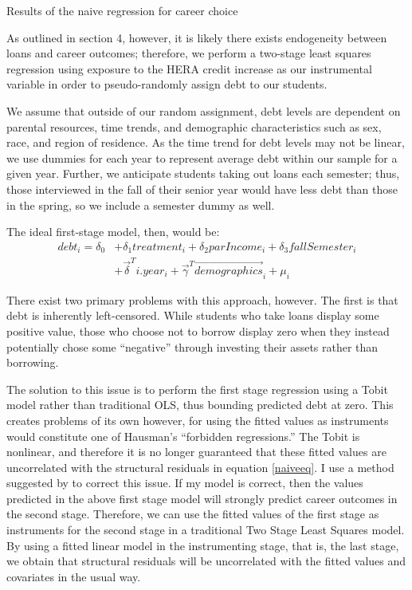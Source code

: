 \documentclass[12pt]{article}
\newcommand{\regs}{../Analysis/Regressions/Output/}
\begin{document}
	\begin{table}
		\centering
		\caption{Results of the naive regression for career choice}
		
		\label{naive2}
	\end{table}
	
	As outlined in section 4, however, it is likely there exists endogeneity between loans and career outcomes; therefore, we perform a two-stage least squares regression using exposure to the HERA credit increase as our instrumental variable in order to pseudo-randomly assign debt to our students. 
	
	We assume that outside of our random assignment, debt levels are dependent on parental resources, time trends, and demographic characteristics such as sex, race, and region of residence. As the time trend for debt levels may not be linear, we use dummies for each year to represent average debt within our sample for a given year. Further, we anticipate students taking out loans each semester; thus, those interviewed in the fall of their senior year would have less debt than those in the spring, so we include a semester dummy as well.
	
	The ideal first-stage model, then, would be: 
	\begin{equation}
	\begin{aligned}
	debt_i = \delta_0 &+ \delta_1 treatment_i + \delta_2 parIncome_i + \delta_3 fallSemester_i \\
	&+ \vec{\delta}^T i.year_i + \vec{\gamma}^T \vec{demographics}_i + \mu_i \label{fseq}
	\end{aligned}
	\end{equation}
	
	There exist two primary problems with this approach, however. The first is that debt is inherently left-censored. While students who take loans display some positive value, those who choose not to borrow display zero when they instead potentially chose some ``negative'' through investing their assets rather than borrowing. 
	
	The solution to this issue is to perform the first stage regression using a Tobit model rather than traditional OLS, thus bounding predicted debt at zero. This creates problems of its own however, for using the fitted values as instruments would constitute one of Hausman's ``forbidden regressions.'' The Tobit is nonlinear, and therefore it is no longer guaranteed that these fitted values are uncorrelated with the structural residuals in equation \ref{naiveeq}. I use a method suggested by \textcite{angrist2009} to correct this issue. If my model is correct, then the values predicted in the above first stage model will strongly predict career outcomes in the second stage. Therefore, we can use the fitted values of the first stage as instruments for the second stage in a traditional Two Stage Least Squares model. By using a fitted linear model in the instrumenting stage, that is, the last stage, we obtain that structural residuals will be uncorrelated with the fitted values and covariates in the usual way. 
	
\end{document}
